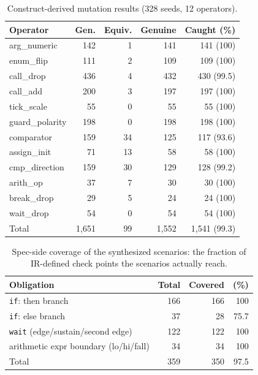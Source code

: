\documentclass[sigconf,nonacm,anonymous,review]{acmart}
\begin{document}
\begin{table}[t]
\centering
\caption{Construct-derived mutation results (328 seeds, 12 operators).}
\label{tab:mutation}
\small
\setlength{\tabcolsep}{4.5pt}
\begin{tabular}{lrrrr}
\toprule
Operator & Gen. & Equiv. & Genuine & Caught (\%) \\
\midrule
arg\_numeric    & 142 & 1  & 141 & 141 (100) \\
enum\_flip      & 111 & 2  & 109 & 109 (100) \\
call\_drop      & 436 & 4  & 432 & 430 (99.5) \\
call\_add       & 200 & 3  & 197 & 197 (100) \\
tick\_scale     & 55  & 0  & 55  & 55 (100) \\
guard\_polarity & 198 & 0  & 198 & 198 (100) \\
comparator      & 159 & 34 & 125 & 117 (93.6) \\
assign\_init    & 71  & 13 & 58  & 58 (100) \\
cmp\_direction  & 159 & 30 & 129 & 128 (99.2) \\
arith\_op       & 37  & 7  & 30  & 30 (100) \\
break\_drop     & 29  & 5  & 24  & 24 (100) \\
wait\_drop      & 54  & 0  & 54  & 54 (100) \\
\midrule
Total           & 1,651 & 99 & 1,552 & 1,541 (99.3) \\
\bottomrule
\end{tabular}
\end{table}

\begin{table}[t]
\centering
\caption{Spec-side coverage of the synthesized scenarios: the fraction of IR-defined check points the scenarios actually reach.}
\label{tab:coverage}
\small
\begin{tabular}{lrrr}
\toprule
Obligation & Total & Covered & (\%) \\
\midrule
\texttt{if}: then branch            & 166 & 166 & 100 \\
\texttt{if}: else branch            & 37  & 28  & 75.7 \\
\texttt{wait} (edge/sustain/second edge) & 122 & 122 & 100 \\
arithmetic expr boundary (lo/hi/fall) & 34  & 34  & 100 \\
\midrule
Total                               & 359 & 350 & 97.5 \\
\bottomrule
\end{tabular}
\end{table}
\end{document}
